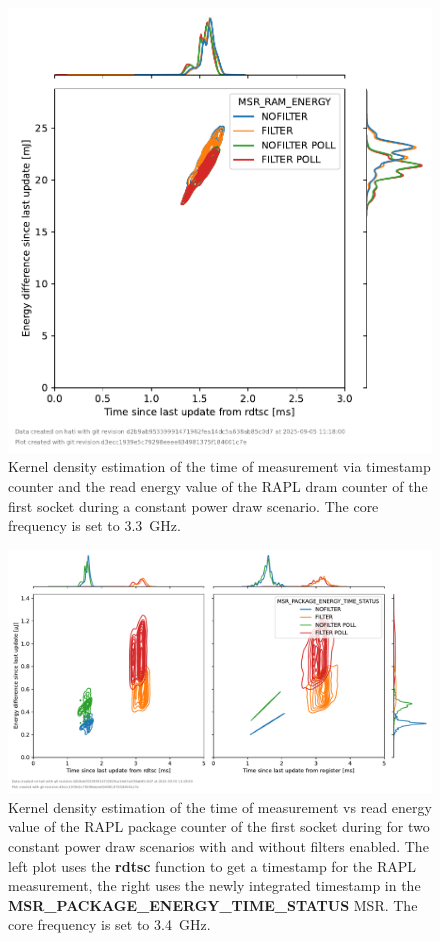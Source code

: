 \begin{figure}[]
    \centering
    \includegraphics[width=0.54\columnwidth]{fig/rapl-update-intervals/MSR_RAM_ENERGY_3300000.pdf}
    \caption{Kernel density estimation of the time of measurement via timestamp counter and the read energy value of the RAPL dram counter of the first socket during a constant power draw scenario.
    The core frequency is set to \SI{3.3}{\GHz}.}
\end{figure}

\clearpage
\begin{figure}[]
    \centering
    \includegraphics[width=\columnwidth]{fig/rapl-update-intervals/MSR_PACKAGE_ENERGY_TIME_STATUS_3400000.pdf}
    \caption{Kernel density estimation of the time of measurement vs read energy value of the RAPL package counter of the first socket during for two constant power draw scenarios with and without filters enabled.
    The left plot uses the \textbf{rdtsc} function to get a timestamp for the RAPL measurement, the right uses the newly integrated timestamp in the \textbf{MSR\_PACKAGE\_ENERGY\_TIME\_STATUS} MSR.
    The core frequency is set to \SI{3.4}{\GHz}.}
\end{figure}

